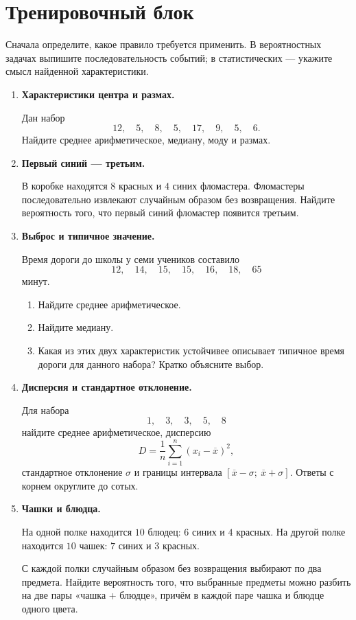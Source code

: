 \documentclass[a4paper,12pt]{article}
\begin{document}
\newpage
\section*{Тренировочный блок}

\textcolor{muted}{Сначала определите, какое правило требуется применить. В вероятностных задачах выпишите последовательность событий; в статистических --- укажите смысл найденной характеристики.}

\begin{enumerate}[label=\textbf{\arabic*.},leftmargin=9mm,itemsep=4mm]

\item \textbf{Характеристики центра и размах.}

Дан набор
\[
12,\quad 5,\quad 8,\quad 5,\quad 17,\quad 9,\quad 5,\quad 6.
\]
Найдите среднее арифметическое, медиану, моду и размах.

\item \textbf{Первый синий --- третьим.}

В коробке находятся $8$ красных и $4$ синих фломастера. Фломастеры последовательно извлекают случайным образом без возвращения. Найдите вероятность того, что первый синий фломастер появится третьим.

\item \textbf{Выброс и типичное значение.}

Время дороги до школы у семи учеников составило
\[
12,\quad14,\quad15,\quad15,\quad16,\quad18,\quad65
\]
минут.

\begin{enumerate}[label=\alph*),leftmargin=7mm,itemsep=2pt,topsep=2pt]
    \item Найдите среднее арифметическое.
    \item Найдите медиану.
    \item Какая из этих двух характеристик устойчивее описывает типичное время дороги для данного набора? Кратко объясните выбор.
\end{enumerate}

\newpage

\item \textbf{Дисперсия и стандартное отклонение.}

Для набора
\[
1,\quad3,\quad3,\quad5,\quad8
\]
найдите среднее арифметическое, дисперсию
\[
D=\frac1n\sum_{i=1}^{n}(x_i-\overline{x})^2,
\]
стандартное отклонение $\sigma$ и границы интервала $[\overline{x}-\sigma;\ \overline{x}+\sigma]$. Ответы с корнем округлите до сотых.

\item \textbf{Чашки и блюдца.}

На одной полке находится $10$ блюдец: $6$ синих и $4$ красных. На другой полке находится $10$ чашек: $7$ синих и $3$ красных.

С каждой полки случайным образом без возвращения выбирают по два предмета. Найдите вероятность того, что выбранные предметы можно разбить на две пары «чашка + блюдце», причём в каждой паре чашка и блюдце одного цвета.

\end{enumerate}
\end{document}

